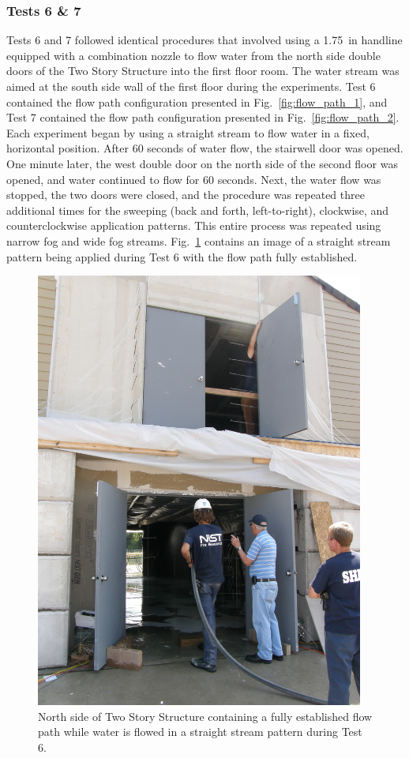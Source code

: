 \documentclass[12pt,oneside]{book}
\begin{document}
\subsubsection{Tests 6 \& 7}
Tests 6 and 7 followed identical procedures that involved using a 1.75~in handline equipped with a combination nozzle to flow water from the north side double doors of the Two Story Structure into the first floor room. The water stream was aimed at the south side wall of the first floor during the experiments. Test 6 contained the flow path configuration presented in Fig.~\ref{fig:flow_path_1}, and Test 7 contained the flow path configuration presented in Fig.~\ref{fig:flow_path_2}. Each experiment began by using a straight stream to flow water in a fixed, horizontal position. After 60 seconds of water flow, the stairwell door was opened. One minute later, the west double door on the north side of the second floor was opened, and water continued to flow for 60 seconds. Next, the water flow was stopped, the two doors were closed, and the procedure was repeated three additional times for the sweeping (back and forth, left-to-right), clockwise, and counterclockwise application patterns. This entire process was repeated using narrow fog and wide fog streams. Fig.~\ref{fig:test_6_pic} contains an image of a straight stream pattern being applied during Test 6 with the flow path fully established.

\begin{figure}[!ht]
	\includegraphics[width=4.25in]{../Figures/Pictures/Test_18}
	\caption[North side of Two Story Structure containing a fully established flow path during Test 6.]{North side of Two Story Structure containing a fully established flow path while water is flowed in a straight stream pattern during Test 6.}
	\label{fig:test_6_pic}
\end{figure}
\FloatBarrier
\end{document}
